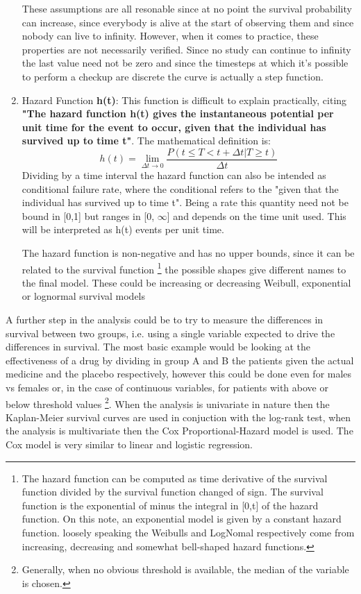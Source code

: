 \begin{enumerate}
These assumptions are all resonable since at no point the survival probability can increase, since everybody is alive at the start of observing them and since nobody can live to infinity.
However, when it comes to practice, these properties are not necessarily verified.
Since no study can continue to infinity the last value need not be zero and since the timesteps at which it's possible to perform a checkup are discrete the curve is actually a step function.
\item Hazard Function \textbf{h(t)}: This function is difficult to explain practically, citing \cite{SurvivalAnalysis} \textbf{"The hazard function h(t) gives the instantaneous potential per unit time for the event to occur, given that the individual has survived up to time t"}. The mathematical definition is:
\begin{equation}
h(t) = \lim\limits_{\Delta t \to 0} \frac{P(t\leq T < t + \Delta t | T\geq t)}{\Delta t}
\end{equation}
Dividing by a time interval the hazard function can also be intended as conditional failure rate, where the conditional refers to the "given that the individual has survived up to time t". Being a rate this quantity need not be bound in [0,1] but ranges in [0, $\infty$] and depends on the time unit used.
 This will be interpreted as h(t) events per unit time.

The hazard function is non-negative and has no upper bounds, since it can be related to the survival function
\footnote{The hazard function can be computed as time derivative of the survival function divided by the survival function changed of sign. The survival function is the exponential of minus the integral in [0,t] of the hazard function. On this note, an exponential model is given by a constant hazard function. loosely speaking the Weibulls and LogNomal respectively come from increasing, decreasing and somewhat bell-shaped hazard functions.} 
the possible shapes give different names to the final model. 
These could be increasing or decreasing Weibull, exponential or lognormal survival models
\end{enumerate}

A further step in the analysis could be to try to measure the differences in survival between two groups, i.e. using a single variable expected to drive the differences in survival.
The most basic example would be looking at the effectiveness of a drug by dividing in group A and B the patients given the actual medicine and the placebo respectively, however this could be done even for males vs females or, in the case of continuous variables, for patients with above or below threshold values
\footnote{Generally, when no obvious threshold is available, the median of the variable is chosen.}.
When the analysis is univariate in nature then the Kaplan-Meier survival curves are used in conjuction with the log-rank test, when the analysis is multivariate then the Cox Proportional-Hazard model is used. 
The Cox model is very similar to linear and logistic regression.

